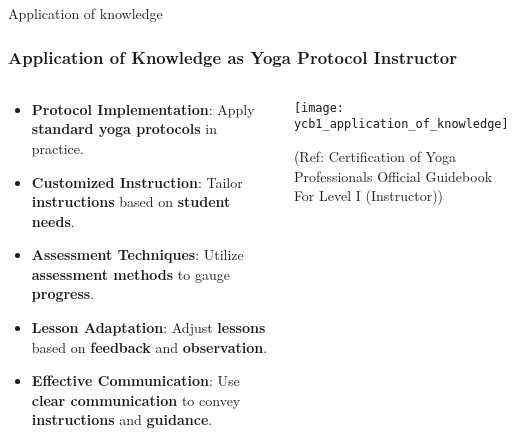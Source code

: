 \begin{frame}[fragile]\frametitle{}
\begin{center}
{\Large Application of knowledge }
\end{center}
\end{frame}


\begin{frame}[fragile]\frametitle{Application of Knowledge as Yoga Protocol Instructor}
\begin{columns}
    \begin{column}[T]{0.5\linewidth}
      \begin{itemize}
        \item \textbf{Protocol Implementation}: Apply \textbf{standard yoga protocols} in practice.
        \item \textbf{Customized Instruction}: Tailor \textbf{instructions} based on \textbf{student needs}.
        \item \textbf{Assessment Techniques}: Utilize \textbf{assessment methods} to gauge \textbf{progress}.
        \item \textbf{Lesson Adaptation}: Adjust \textbf{lessons} based on \textbf{feedback} and \textbf{observation}.
        \item \textbf{Effective Communication}: Use \textbf{clear communication} to convey \textbf{instructions} and \textbf{guidance}.
      \end{itemize}
    \end{column}
    \begin{column}[T]{0.5\linewidth}
        \begin{center}
        \texttt{[image: ycb1\_application\_of\_knowledge]}

		{\tiny (Ref: Certification  of Yoga Professionals Official Guidebook For Level I (Instructor))}		
		
        \end{center}	
    \end{column}
\end{columns}
\end{frame}

